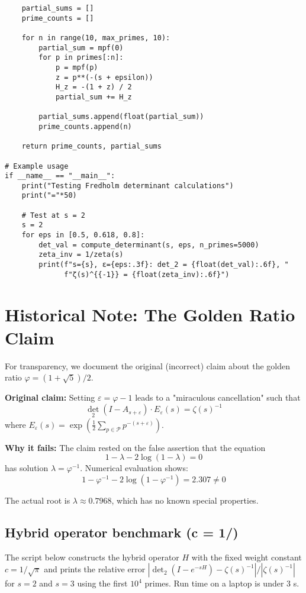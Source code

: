 \documentclass[11pt,a4paper]{article}
\theoremstyle{definition}
\theoremstyle{remark}
\newcommand{\calP}{\mathcal{P}}
\DeclareMathOperator{\det}{det}
\begin{document}
\begin{lstlisting}
    partial_sums = []
    prime_counts = []
    
    for n in range(10, max_primes, 10):
        partial_sum = mpf(0)
        for p in primes[:n]:
            p = mpf(p)
            z = p**(-(s + epsilon))
            H_z = -(1 + z) / 2
            partial_sum += H_z
        
        partial_sums.append(float(partial_sum))
        prime_counts.append(n)
    
    return prime_counts, partial_sums

# Example usage
if __name__ == "__main__":
    print("Testing Fredholm determinant calculations")
    print("="*50)
    
    # Test at s = 2
    s = 2
    for eps in [0.5, 0.618, 0.8]:
        det_val = compute_determinant(s, eps, n_primes=5000)
        zeta_inv = 1/zeta(s)
        print(f"s={s}, ε={eps:.3f}: det_2 = {float(det_val):.6f}, "
              f"ζ(s)^{{-1}} = {float(zeta_inv):.6f}")
\end{lstlisting}

\section{Historical Note: The Golden Ratio Claim}\label{app:golden}

For transparency, we document the original (incorrect) claim about the golden ratio 
$\varphi = (1+\sqrt{5})/2$.

\textbf{Original claim:} Setting $\varepsilon = \varphi - 1$ leads to a "miraculous 
cancellation" such that
\[
\det_2(I - A_{s+\varepsilon}) \cdot E_\varepsilon(s) = \zeta(s)^{-1}
\]
where $E_\varepsilon(s) = \exp\left(\frac{1}{2}\sum_{p \in \calP} p^{-(s+\varepsilon)}\right)$.

\textbf{Why it fails:} The claim rested on the false assertion that the equation
\[
1 - \lambda - 2\log(1-\lambda) = 0
\]
has solution $\lambda = \varphi^{-1}$. Numerical evaluation shows:
\[
1 - \varphi^{-1} - 2\log(1-\varphi^{-1}) = 2.307 \neq 0
\]

The actual root is $\lambda \approx 0.7968$, which has no known special properties.

\subsection{Hybrid operator benchmark (c = 1/\sqrt{\pi})}

The script below constructs the hybrid operator $H$ with the fixed weight constant $c=1/\sqrt{\pi}$ and prints the relative error
$|\det_2(I-e^{-sH})-\zeta(s)^{-1}|/|\zeta(s)^{-1}|$ for $s=2$ and $s=3$ using the first $10^4$ primes.  Run time on a laptop is
under 3 s.
\end{document}
